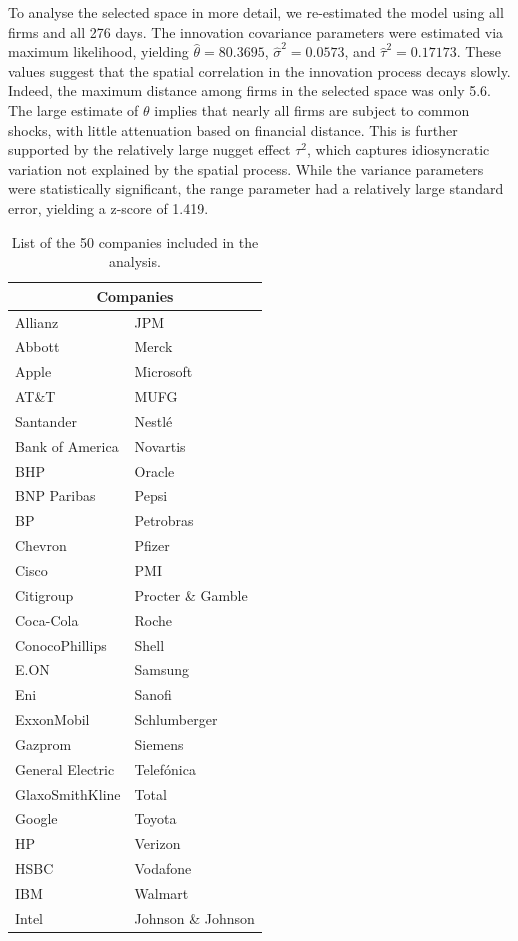 \documentclass[fleqn,11pt]{article}
\begin{document}
To analyse the selected space in more detail, we re-estimated the model using all firms and all 276 days. The innovation covariance parameters were estimated via maximum likelihood, yielding $\hat{\theta} = 80.3695$, $\hat{\sigma}^2 = 0.0573$, and $\hat{\tau}^2 = 0.17173$. These values suggest that the spatial correlation in the innovation process decays slowly. Indeed, the maximum distance among firms in the selected space was only 5.6. The large estimate of $\theta$ implies that nearly all firms are subject to common shocks, with little attenuation based on financial distance. This is further supported by the relatively large nugget effect $\tau^2$, which captures idiosyncratic variation not explained by the spatial process. While the variance parameters were statistically significant, the range parameter had a relatively large standard error, yielding a z-score of 1.419.

\begin{table}
\centering
\caption{List of the 50 companies included in the analysis.}
\begin{tabular}{ll}
\hline
\multicolumn{2}{c}{\textbf{Companies}} \\
\hline
Allianz        & JPM         \\
Abbott         & Merck       \\
Apple          & Microsoft   \\
AT\&T          & MUFG        \\
Santander      & Nestlé      \\
Bank of America & Novartis   \\
BHP            & Oracle      \\
BNP Paribas    & Pepsi       \\
BP             & Petrobras   \\
Chevron        & Pfizer      \\
Cisco          & PMI         \\
Citigroup      & Procter \& Gamble \\
Coca-Cola      & Roche       \\
ConocoPhillips & Shell       \\
E.ON           & Samsung     \\
Eni            & Sanofi      \\
ExxonMobil     & Schlumberger \\
Gazprom        & Siemens     \\
General Electric & Telefónica \\
GlaxoSmithKline & Total      \\
Google         & Toyota      \\
HP             & Verizon     \\
HSBC           & Vodafone    \\
IBM            & Walmart     \\
Intel          & Johnson \& Johnson \\
\hline
\end{tabular}
\label{tab:stocks}
\end{table}
\end{document}

